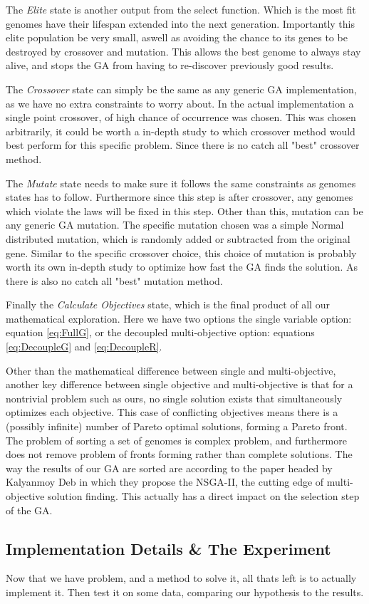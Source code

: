 \documentclass[12pt]{article}
\begin{document}
    The \textit{Elite} state is another output from the select function. Which is
    the most fit genomes have their lifespan extended into the next generation.
    Importantly this elite population be very small, aswell as avoiding the
    chance to its genes to be destroyed by crossover and mutation. \cite{DeJong}
    This allows the best genome to always stay alive, and stops the GA from
    having to re-discover previously good results.

    The \textit{Crossover} state can simply be the same as any generic GA implementation,
    as we have no extra constraints to worry about. In the actual implementation
    a single point crossover, of high chance of occurrence was chosen. This was
    chosen arbitrarily, it could be worth a in-depth study to which crossover
    method would best perform for this specific problem. Since there is no catch all
    "best" crossover method.

    The \textit{Mutate} state needs to make sure it follows the same constraints as
    genomes states has to follow. Furthermore since this step is after crossover,
    any genomes which violate the laws will be fixed in this step. Other than this,
    mutation can be any generic GA mutation. The specific mutation chosen was a
    simple Normal distributed mutation, which is randomly added or subtracted from
    the original gene. Similar to the specific crossover choice, this choice
    of mutation is probably worth its own in-depth study to optimize how fast
    the GA finds the solution. As there is also no catch all "best" mutation method.

    Finally the \textit{Calculate Objectives} state, which is the final product of all our
    mathematical exploration. Here we have two options the single variable option: equation
    \ref{eq:FullG}, or the decoupled multi-objective option: equations \ref{eq:DecoupleG}
    and \ref{eq:DecoupleR}. 

    Other than the mathematical difference between single and multi-objective,
    another key difference between single objective and multi-objective is that for a
    nontrivial problem such as ours, no single solution exists that simultaneously
    optimizes each objective. This case of conflicting objectives means there is
    a (possibly infinite) number of Pareto optimal solutions, forming a Pareto front.
    The problem of sorting a set of genomes is complex problem, and furthermore
    does not remove problem of fronts forming rather than complete solutions.
    The way the results of our GA are sorted are according to the paper headed by
    Kalyanmoy Deb \cite{DebPratapAgarwalMeyarivan} in which they propose the
    NSGA-II, the cutting edge of multi-objective solution finding. This actually
    has a direct impact on the selection step of the GA.

\subsection{Implementation Details \& The Experiment}

    Now that we have problem, and a method to solve it, all thats left is to actually
    implement it. Then test it on some data, comparing our hypothesis to the results.

    

\pagebreak


\end{document}
